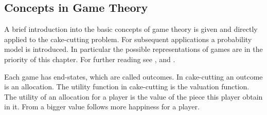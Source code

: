 \subsection{Concepts in Game Theory}
A brief introduction into the basic concepts of game theory is given and directly applied to the cake-cutting problem. For subsequent applications a probability model is introduced.%
 In particular the possible representations of games are in the priority of this chapter. For further reading see \cite{gtt}, \cite{stl} and \cite{ba}. 
Each game has end-states, which are called outcomes. In cake-cutting an outcome is an allocation.
The utility function in cake-cutting is the valuation function. The utility of an allocation for a player is the value of the piece this player obtain in it. From a bigger value follows more happiness for a player.
